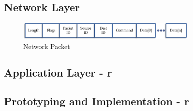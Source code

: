 \subsection{Network Layer}

\begin{figure}[htb]
\centering
\includegraphics[width=0.8\textwidth]{figures/network_packet.png}
\caption{Network Packet}
\label{fig:network_packet}
\end{figure}


\subsection{Application Layer - r}

\subsection{Prototyping and Implementation - r}